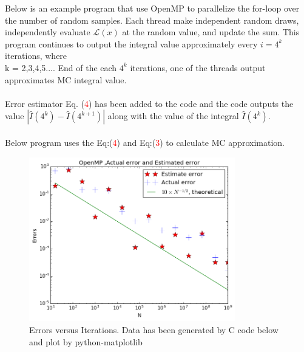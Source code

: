 \documentclass{article}
\begin{document}
\newpage
Below is an example program that use OpenMP to parallelize the for-loop over the number of random samples. Each thread make independent random draws, independently evaluate  $\mathcal{L}(x)$ at the random value, and update the sum. This program  continues to output the integral value approximately every $i = 4^k$ iterations, where 
\\
k = 2,3,4,5.... End of the each $4^k$ iterations, one of the threads output approximates MC integral value.
\\
\\
Error estimator Eq. (\textcolor{red}{4}) has been added to the code and the code outputs the value $|\hat{I}(4^k)-\hat{I}(4^{k+1})|$ 
along with the value of the integral $ \hat{I}(4^k) $.
\\
\\
Below program uses the  Eq:(\textcolor{red}{4})  and  Eq:(\textcolor{red}{3}) to calculate MC approximation.   

\begin{figure}[htb]
	\begin{center}
		\includegraphics[width=0.8\textwidth]{hw4_p2b.png}
	\end{center}
	\caption{Errors versus Iterations. Data has been generated by C code below and plot by python-matplotlib }
	\label{fig:hw4_p2b}
\end{figure}
\end{document}
